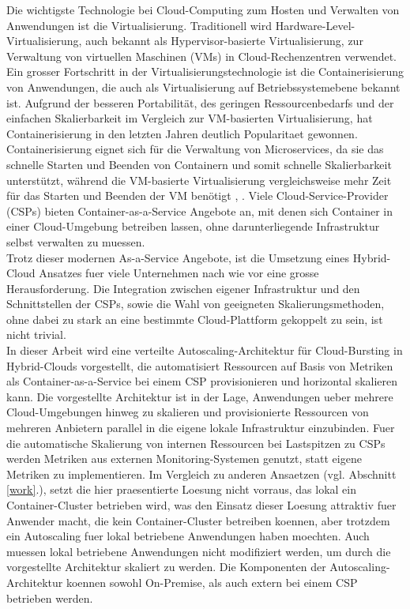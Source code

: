 \documentclass[runningheads]{llncs}
\begin{document}
Die wichtigste Technologie bei Cloud-Computing zum Hosten und Verwalten von Anwendungen ist die Virtualisierung. Traditionell wird Hardware-Level-Virtualisierung, auch bekannt als Hypervisor-basierte Virtualisierung, zur Verwaltung von virtuellen Maschinen (VMs) in Cloud-Rechenzentren verwendet. Ein grosser Fortschritt in der Virtualisierungstechnologie ist die Containerisierung von Anwendungen, die auch als Virtualisierung auf Betriebssystemebene bekannt ist. Aufgrund der besseren Portabilität, des geringen Ressourcenbedarfs und der einfachen Skalierbarkeit im Vergleich zur VM-basierten Virtualisierung, hat Containerisierung in den letzten Jahren deutlich Popularitaet gewonnen. Containerisierung eignet sich für die Verwaltung von Microservices, da sie das schnelle Starten und Beenden von Containern und somit schnelle Skalierbarkeit unterstützt, während die VM-basierte Virtualisierung vergleichsweise mehr Zeit für das Starten und Beenden der VM benötigt \cite{al-dhuraibi_elasticity_2018}, \cite{abdullah_containers_2019}. Viele Cloud-Service-Provider (CSPs) bieten Container-as-a-Service Angebote an, mit denen sich Container in einer Cloud-Umgebung betreiben lassen, ohne darunterliegende Infrastruktur selbst verwalten zu muessen. \\

Trotz dieser modernen As-a-Service Angebote, ist die Umsetzung eines Hybrid-Cloud Ansatzes fuer viele Unternehmen nach wie vor eine grosse Herausforderung. Die Integration zwischen eigener Infrastruktur und den Schnittstellen der CSPs, sowie die Wahl von geeigneten Skalierungsmethoden, ohne dabei zu stark an eine bestimmte Cloud-Plattform gekoppelt zu sein, ist nicht trivial.  \\

In dieser Arbeit wird eine verteilte Autoscaling-Architektur für Cloud-Bursting in Hybrid-Clouds vorgestellt, die automatisiert Ressourcen auf Basis von Metriken als Container-as-a-Service bei einem CSP provisionieren und horizontal skalieren kann. Die vorgestellte Architektur ist in der Lage, Anwendungen ueber mehrere Cloud-Umgebungen hinweg zu skalieren und provisionierte Ressourcen von mehreren Anbietern parallel in die eigene lokale Infrastruktur einzubinden. Fuer die automatische Skalierung von internen Ressourcen bei Lastspitzen zu CSPs werden Metriken aus externen Monitoring-Systemen genutzt, statt eigene Metriken zu implementieren. Im Vergleich zu anderen Ansaetzen (vgl. Abschnitt \ref{work}.), setzt die hier praesentierte Loesung nicht vorraus, das lokal ein Container-Cluster betrieben wird, was den Einsatz dieser Loesung attraktiv fuer Anwender macht, die kein Container-Cluster betreiben koennen, aber trotzdem ein Autoscaling fuer lokal betriebene Anwendungen haben moechten. Auch muessen lokal betriebene Anwendungen nicht modifiziert werden, um durch die vorgestellte Architektur skaliert zu werden. Die Komponenten der Autoscaling-Architektur koennen sowohl On-Premise, als auch extern bei einem CSP betrieben werden.
\end{document}
